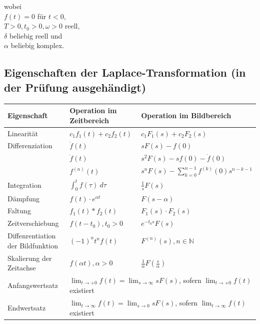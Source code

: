 \documentclass[10pt,a4paper]{article}
\begin{document}
\begin{multicols}{2}
wobei \\
$f(t) = 0$ für $t < 0$, \\
$T > 0, t_0 > 0, \omega > 0$ reell, \\
$\delta$ beliebig reell und \\
$\alpha$ beliebig komplex.
\end{multicols}

\subsection{Eigenschaften der Laplace-Transformation (in der Prüfung ausgehändigt)} 
\begin{tabularx}{\columnwidth}{|X|X|X|}
	\hline
	Eigenschaft & Operation im Zeitbereich & Operation im Bildbereich \\
	\hline
	\hline
	Linearität & $c_1f_1(t) + c_2f_2(t)$ & $c_1 F_1(s) + c_2 F_2(s)$ \\
	\hline
	Differenziation & $\dot f(t)$ & $sF(s) - f(0)$ \\
	& $\ddot f(t)$ & $s^2 F(s) - sf(0) - \dot f(0)$ \\
	& $f^{(n)}(t)$ & $s^n F(s) - \sum_{k=0}^{n-1} f^{(k)}(0) s^{n-k-1}$ \\
	\hline
	Integration & $\int_0^t f(\tau) ~d\tau$ & $\frac 1 s F(s)$ \\
	\hline
	Dämpfung & $f(t) ⋅ e^{\alpha t}$ & $F(s-\alpha)$ \\
	\hline
	Faltung & $f_1(t) * f_2(t)$ & $F_1(s) ⋅ F_2(s)$ \\
	\hline
	Zeitverschiebung & $f(t - t_0), t_0 > 0$ & $e^{-t_0 s}F(s)$ \\
	\hline
	Diffenrentiation der Bildfunktion & $(-1)^n t^n f(t)$ & $F^{(n)}(s), n \in \mathbb{N}$ \\
	\hline
	Skalierung der Zeitachse & $f(\alpha t), \alpha > 0$ & $\frac 1 \alpha F(\frac s \alpha)$ \\
	\hline
	Anfangswertsatz & \multicolumn{2}{X|}{$\lim_{t → +0} f(t) = \lim_{s → ∞} s F(s)$, sofern $\lim_{t → +0} f(t)$ existiert} \\
	\hline
	Endwertsatz & \multicolumn{2}{X|}{$\lim_{t → ∞} f(t) = \lim_{s → 0} sF(s)$, sofern $\lim_{t → ∞} f(t)$ existiert} \\
	\hline
\end{tabularx}
\end{document}

